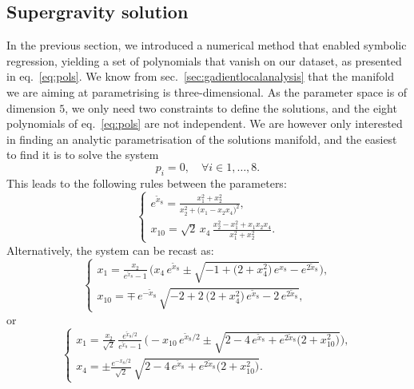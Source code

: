 \documentclass[11pt,a4paper]{article}
\begin{document}
	\subsection{Supergravity solution}
	In the previous section, we introduced a numerical method that enabled symbolic regression, yielding a set of polynomials that vanish on our dataset, as presented in eq.~\eqref{eq:pols}. We know from sec.~\ref{sec:gadientlocalanalysis} that the manifold we are aiming at parametrising is three-dimensional. As the parameter space is of dimension $5$, we only need two constraints to define the solutions, and the eight polynomials of eq.~\eqref{eq:pols} are not independent. We are however only interested in finding an analytic parametrisation of the solutions manifold, and the easiest to find it is to solve the system
	\begin{equation}\label{eq:solvepol}
		p_i = 0, \quad \forall i \in {1,\dots,8}.
	\end{equation}
	This leads to the following rules between the parameters:
	\begin{equation}\label{eq:rulex8x10}
		\begin{cases}
			\displaystyle e^{\tilde{x}_{8}} = \frac{x_{1}^{2}+x_{2}^{2}}{x_{2}^{2} + \big(x_{1}-x_{2}x_{4}\big)^{2}},\\[10pt]
			\displaystyle x_{10} = \sqrt{2}\,x_{4}\,\frac{x_{2}^{2} - x_{1}^{2}+x_{1}x_{2}x_{4}}{x_{1}^{2}+x_{2}^{2}}.
		\end{cases}
	\end{equation}
	Alternatively, the system can be recast as:
	\begin{equation}
		\begin{cases}
			\displaystyle x_{1} = \frac{x_{2}}{e^{\tilde{x}_{8}}-1}\,\Big(x_{4}\,e^{\tilde{x}_{8}} \pm \sqrt{-1+\big(2+x_{4}^{2}\big)\,e^{x_{8}}-e^{2\tilde{x}_{8}}}\Big),\\[8pt]
			\displaystyle x_{10} = \mp\,e^{-\tilde{x}_{8}}\,\sqrt{-2+2\,\big(2+x_{4}^{2}\big)\,e^{\tilde{x}_{8}}-2\,e^{2\tilde{x}_{8}}},
		\end{cases}
	\end{equation}
	or
	\begin{equation}
		\begin{cases}
			\displaystyle x_{1} = \frac{x_{2}}{\sqrt{2}}\,\frac{e^{\tilde{x}_{8}/2}}{e^{\tilde{x}_{8}}-1}\,\Big(-x_{10}\,e^{\tilde{x}_{8}/2} \pm \sqrt{2-4\,e^{\tilde{x}_{8}}+e^{2\tilde{x}_{8}}\big(2+x_{10}^{2}\big)}\Big),\\[8pt]
			\displaystyle x_{4} = \pm \frac{e^{-x_{8}/2}}{\sqrt{2}}\,\sqrt{2-4\,e^{\tilde{x}_{8}}+e^{2\tilde{x}_{8}}\big(2+x_{10}^{2}\big)}.
		\end{cases}
	\end{equation}
\end{document}
